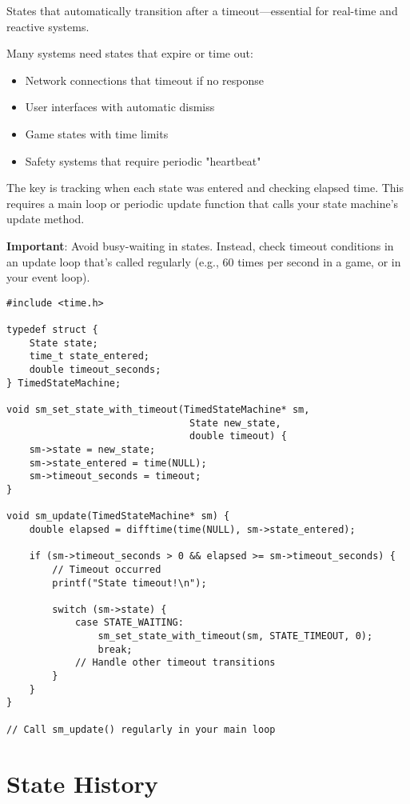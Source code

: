 States that automatically transition after a timeout---essential for real-time and reactive systems.

Many systems need states that expire or time out:
\begin{itemize}
    \item Network connections that timeout if no response
    \item User interfaces with automatic dismiss
    \item Game states with time limits
    \item Safety systems that require periodic "heartbeat"
\end{itemize}

The key is tracking when each state was entered and checking elapsed time. This requires a main loop or periodic update function that calls your state machine's update method.

\textbf{Important}: Avoid busy-waiting in states. Instead, check timeout conditions in an update loop that's called regularly (e.g., 60 times per second in a game, or in your event loop).

\begin{lstlisting}
#include <time.h>

typedef struct {
    State state;
    time_t state_entered;
    double timeout_seconds;
} TimedStateMachine;

void sm_set_state_with_timeout(TimedStateMachine* sm,
                                State new_state,
                                double timeout) {
    sm->state = new_state;
    sm->state_entered = time(NULL);
    sm->timeout_seconds = timeout;
}

void sm_update(TimedStateMachine* sm) {
    double elapsed = difftime(time(NULL), sm->state_entered);

    if (sm->timeout_seconds > 0 && elapsed >= sm->timeout_seconds) {
        // Timeout occurred
        printf("State timeout!\n");

        switch (sm->state) {
            case STATE_WAITING:
                sm_set_state_with_timeout(sm, STATE_TIMEOUT, 0);
                break;
            // Handle other timeout transitions
        }
    }
}

// Call sm_update() regularly in your main loop
\end{lstlisting}

\section{State History}

